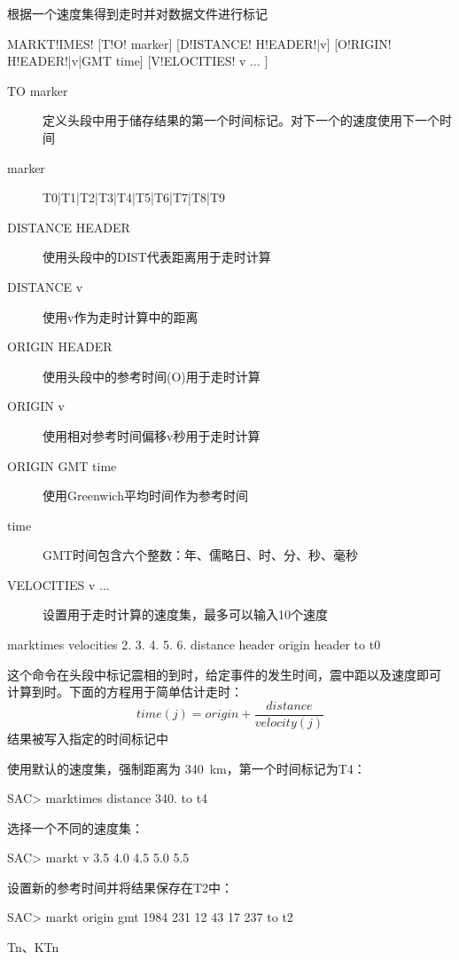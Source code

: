 \label{cmd:marktimes}

根据一个速度集得到走时并对数据文件进行标记

\begin{SACSTX}
MARKT!IMES! [T!O! marker] [D!ISTANCE! H!EADER!|v] [O!RIGIN! H!EADER!|v|GMT time]
    [V!ELOCITIES! v ... ]
\end{SACSTX}

\begin{description}
\item [TO marker] 定义头段中用于储存结果的第一个时间标记。对下一个的速度使用下一个时间
\item [marker]  T0|T1|T2|T3|T4|T5|T6|T7|T8|T9
\item [DISTANCE HEADER] 使用头段中的DIST代表距离用于走时计算
\item [DISTANCE v] 使用v作为走时计算中的距离
\item [ORIGIN HEADER] 使用头段中的参考时间(O)用于走时计算
\item [ORIGIN v] 使用相对参考时间偏移v秒用于走时计算
\item [ORIGIN GMT time] 使用Greenwich平均时间作为参考时间
\item [time] GMT时间包含六个整数：年、儒略日、时、分、秒、毫秒
\item [VELOCITIES v ... ] 设置用于走时计算的速度集，最多可以输入10个速度
\end{description}

\begin{SACDFT}
marktimes velocities 2. 3. 4. 5. 6. distance
    header origin header to t0
\end{SACDFT}

这个命令在头段中标记震相的到时，给定事件的发生时间，震中距以及速度即可
计算到时。下面的方程用于简单估计走时：
 		\[ time(j) = origin + \frac{distance}{velocity(j)} \]
结果被写入指定的时间标记中

使用默认的速度集，强制距离为 \SI{340}{\km}，第一个时间标记为T4：
\begin{SACCode}
SAC> marktimes distance 340. to t4
\end{SACCode}

选择一个不同的速度集：
\begin{SACCode}
SAC> markt v 3.5 4.0 4.5 5.0 5.5
\end{SACCode}

设置新的参考时间并将结果保存在T2中：
\begin{SACCode}
SAC> markt origin gmt 1984 231 12 43 17 237 to t2
\end{SACCode}

Tn、KTn
